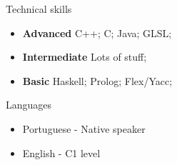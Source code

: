 \documentclass[]{mcdowellcv}
\begin{document}
	\begin{cvsection}{Technical skills}
		\begin{cvsubsection}{}{}{}
			\begin{itemize}
				\item \textbf{Advanced} C++; C; Java; GLSL;
				\item \textbf{Intermediate} Lots of stuff;
				\item \textbf{Basic} Haskell; Prolog; Flex/Yacc;
			\end{itemize}
		\end{cvsubsection}
	\end{cvsection}

	\begin{cvsection}{Languages}
		\begin{cvsubsection}{}{}{}
			\begin{itemize}
				\item Portuguese - Native speaker
				\item English - C1 level
			\end{itemize}
		\end{cvsubsection}
	\end{cvsection}
\end{document}
